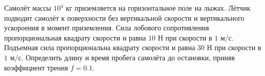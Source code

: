 Самолёт массы $10^4$ кг приземляется на горизонтальное поле на лыжах.
Лётчик подводит самолёт к поверхности без вертикальной скорости и
вертикального ускороения в момент приземления. Сила лобового
сопротивления пропорциональная квадрату скорости и равна $10$ Н при
скорости в $1$ м/с. Подъемная сила пропорциональна квадрату скорости
и равна $30$ Н при скорости в $1$ м/с. Определить длину и время пробега
самолёта до остановки, приняв коэффициент трения $f=0.1$.
